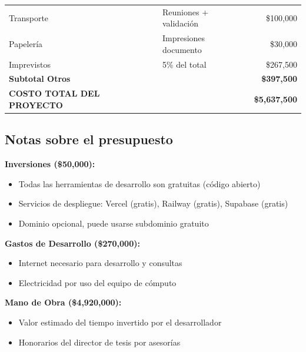 \documentclass[spanish]{ieee_upb}
\begin{document}
\begin{table}[h!]
\begin{tabular}{lp{6cm}r}
		\addlinespace
		\midrule
		\multicolumn{3}{c}{\textbf{OTROS GASTOS}}                                                       \\
		\midrule
		Transporte                        & Reuniones + validación                & \$100,000            \\
		Papelería                         & Impresiones documento                 & \$30,000             \\
		Imprevistos                       & 5\% del total                         & \$267,500            \\
		\midrule
		\textbf{Subtotal Otros}           &                                       & \textbf{\$397,500}   \\
		\addlinespace
		\midrule
		\textbf{COSTO TOTAL DEL PROYECTO} &                                       & \textbf{\$5,637,500} \\
		\bottomrule
	\end{tabular}
\end{table}

\subsection{Notas sobre el presupuesto}

\textbf{Inversiones (\$50,000):}

\begin{itemize}
	\item Todas las herramientas de desarrollo son gratuitas (código abierto)
	\item Servicios de despliegue: Vercel (gratis), Railway (gratis), Supabase (gratis)
	\item Dominio opcional, puede usarse subdominio gratuito
\end{itemize}

\textbf{Gastos de Desarrollo (\$270,000):}

\begin{itemize}
	\item Internet necesario para desarrollo y consultas
	\item Electricidad por uso del equipo de cómputo
\end{itemize}

\textbf{Mano de Obra (\$4,920,000):}

\begin{itemize}
	\item Valor estimado del tiempo invertido por el desarrollador
	\item Honorarios del director de tesis por asesorías
\end{itemize}
\end{document}
